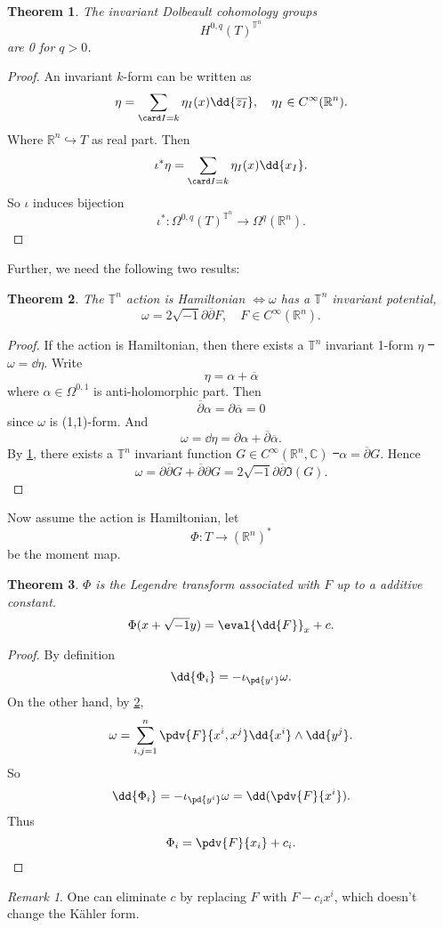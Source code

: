 \documentclass[12pt]{article}
\theoremstyle{plain}\newtheorem{theorem}{Theorem}
\theoremstyle{definition}\newtheorem{definition}[theorem]{Definition}
\theoremstyle{definition}\newtheorem{example}[theorem]{Example}
\theoremstyle{plain}\newtheorem{axiom}[theorem]{Axiom}
\theoremstyle{plain}\newtheorem{assertion}[theorem]{Assertion}
\theoremstyle{plain}\newtheorem{corollary}[theorem]{Corollary}
\theoremstyle{plain}\newtheorem{lemma}[theorem]{Lemma}
\theoremstyle{plain}\newtheorem{proposition}[theorem]{Proposition}
\theoremstyle{plain}\newtheorem{prop}[theorem]{Proposition}
\theoremstyle{plain}\newtheorem{conjecture}[theorem]{Conjecture}
\theoremstyle{plain}\newtheorem{conj}[theorem]{Conjecture}
\theoremstyle{plain}\newtheorem{problem}[theorem]{Problem}
\theoremstyle{remark}\newtheorem{notation}[theorem]{Notation}
\theoremstyle{definition}\newtheorem*{question}{Question}
\theoremstyle{definition}\newtheorem*{answer}{Answer}
\theoremstyle{definition}\newtheorem*{goal}{Goal}
\theoremstyle{plain}\newtheorem*{application}{Application}
\theoremstyle{plain}\newtheorem*{exercise}{Exercise}
\theoremstyle{remark}\newtheorem*{remark}{Remark}
\theoremstyle{remark}\newtheorem*{note}{\small{Note}}
\numberwithin{equation}{section}
\numberwithin{theorem}{section}
\numberwithin{figure}{section}
\begin{document}
\begin{theorem}\label{thm:trivial-cohomology}
    The invariant Dolbeault cohomology groups \[
        H^{0,q}(T)^{\mathbb{T}^n}
    \] are 0 for \(q>0\).
\end{theorem}
\begin{proof}
    An invariant \(k\)-form can be written as \[
        \eta=\sum_{\card I=k}\eta_I(x)\dd{\overline{z_I}},
        \quad \eta_I\in C^\infty(\mathbb{R}^n)
    .\] Where \(\mathbb{R}^n\hookrightarrow T\) as real part.
    Then \[
        \iota^*\eta=\sum_{\card I=k}\eta_I(x)\dd{x_I}
    .\] So \(\iota\) induces bijection \[
        \iota^*\colon \Omega^{0,q}(T)^{\mathbb{T}^n}
        \longrightarrow\Omega^q(\mathbb{R}^n)
    .\]
\end{proof}

Further, we need the following two results:
\begin{theorem}\label{thm:metric-potential}
    The \(\mathbb{T}^n\) action is Hamiltonian \(\iff \omega\) has a \(\mathbb{T}^n\)
    invariant potential, \ie\ \[
        \omega=2\sqrt{-1}\partial\overline{\partial}F,
        \quad F\in C^\infty(\mathbb{R}^n)
    .\]
\end{theorem}
\begin{proof}
    If the action is Hamiltonian, then there exists a \(\mathbb{T}^n\) invariant
    1-form \(\eta\) \st\ \(\omega=\dd{\eta}\). Write \[
        \eta=\alpha+\overline{\alpha}
    \] where \(\alpha\in \Omega^{0,1}\) is anti-holomorphic part. Then \[
        \overline{\partial}\alpha=\partial\overline{\alpha}=0
    \] since \(\omega\) is (1,1)-form. And \[
        \omega=\dd{\eta}=\partial\alpha+\overline{\partial}\overline{\alpha}
    .\] By \cref{thm:trivial-cohomology}, there exists a \(\mathbb{T}^n\) invariant
    function \(G\in C^\infty(\mathbb{R}^n,\mathbb{C})\) \st\ \(\alpha=
    \overline{\partial}G\).
    Hence \[
        \omega=\partial\overline{\partial}G+\overline{\partial}\partial G
        =2\sqrt{-1}\partial\overline{\partial}\Im(G)
    .\] 
\end{proof}

Now assume the action is Hamiltonian, let \[
    \Phi\colon T\longrightarrow (\mathbb{R}^n)^*
\] be the moment map.
\begin{theorem}
    \(\Phi\) is the Legendre transform associated with \(F\) up to a additive constant.
    \ie\ \[
        \Phi(x+\sqrt{-1}y)=\eval{\dd{F}}_{x}+c
    .\] 
\end{theorem}
\begin{proof}
    By definition \[
        \dd{\Phi_i}=-\iota_{\pd{y^i}}\omega
    .\] On the other hand, by \cref{thm:metric-potential}, \[
        \omega=\sum_{i,j=1}^n \pdv{F}{x^i,x^j} \dd{x^i}\wedge \dd{y^j}
    .\] So \[
        \dd{\Phi_i}=-\iota_{\pd{y^i}}\omega=\dd(\pdv{F}{x^i})
    .\] Thus \[
    \Phi_i=\pdv{F}{x_i}+c_i
    .\] 
\end{proof}
\begin{remark}
    One can eliminate \(c\) by replacing \(F\) with \(F-c_i x^i\), which doesn't
    change the K\"ahler form.
\end{remark}
\end{document}
